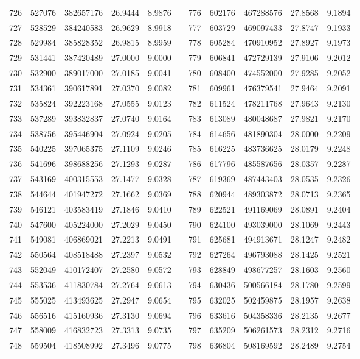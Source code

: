 \begin{longtable}{rrrrrrrrrrr}
726&527076&382657176&26.9444&8.9876&&776&602176&467288576&27.8568&9.1894\\
727&528529&384240583&26.9629&8.9918&&777&603729&469097433&27.8747&9.1933\\
728&529984&385828352&26.9815&8.9959&&778&605284&470910952&27.8927&9.1973\\
729&531441&387420489&27.0000&9.0000&&779&606841&472729139&27.9106&9.2012\\
730&532900&389017000&27.0185&9.0041&&780&608400&474552000&27.9285&9.2052\\
731&534361&390617891&27.0370&9.0082&&781&609961&476379541&27.9464&9.2091\\
732&535824&392223168&27.0555&9.0123&&782&611524&478211768&27.9643&9.2130\\
733&537289&393832837&27.0740&9.0164&&783&613089&480048687&27.9821&9.2170\\
734&538756&395446904&27.0924&9.0205&&784&614656&481890304&28.0000&9.2209\\
735&540225&397065375&27.1109&9.0246&&785&616225&483736625&28.0179&9.2248\\
736&541696&398688256&27.1293&9.0287&&786&617796&485587656&28.0357&9.2287\\
737&543169&400315553&27.1477&9.0328&&787&619369&487443403&28.0535&9.2326\\
738&544644&401947272&27.1662&9.0369&&788&620944&489303872&28.0713&9.2365\\
739&546121&403583419&27.1846&9.0410&&789&622521&491169069&28.0891&9.2404\\
740&547600&405224000&27.2029&9.0450&&790&624100&493039000&28.1069&9.2443\\
741&549081&406869021&27.2213&9.0491&&791&625681&494913671&28.1247&9.2482\\
742&550564&408518488&27.2397&9.0532&&792&627264&496793088&28.1425&9.2521\\
743&552049&410172407&27.2580&9.0572&&793&628849&498677257&28.1603&9.2560\\
744&553536&411830784&27.2764&9.0613&&794&630436&500566184&28.1780&9.2599\\
745&555025&413493625&27.2947&9.0654&&795&632025&502459875&28.1957&9.2638\\
746&556516&415160936&27.3130&9.0694&&796&633616&504358336&28.2135&9.2677\\
747&558009&416832723&27.3313&9.0735&&797&635209&506261573&28.2312&9.2716\\
748&559504&418508992&27.3496&9.0775&&798&636804&508169592&28.2489&9.2754\\

\end{longtable}
